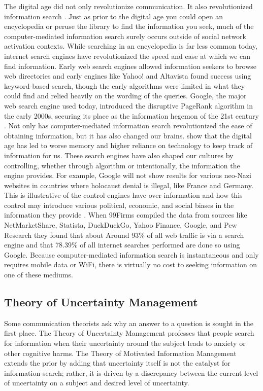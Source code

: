 The digital age did not only revolutionize communication. It also
revolutionized information search \citep{ramirez2002information}. Just as prior
to the digital age you could open an encyclopedia or peruse the library to find
the information you seek, much of the computer-mediated information search
surely occurs outside of social network activation contexts. While searching in
an encyclopedia is far less common today, internet search engines have
revolutionized the speed and ease at which we can find information. Early web
search engines allowed information seekers to browse web directories and early
engines like Yahoo! and Altavista found success using keyword-based search,
though the early algorithms were limited in what they could find and relied
heavily on the wording of the queries. Google, the major web search engine used
today, introduced the disruptive PageRank algorithm in the early 2000s, securing
its place as the information hegemon of the 21st century
\citep{brin1998anatomy}. Not only has computer-mediated information search
revolutionized the ease of obtaining information, but it has also changed our
brains. \citet{sparrow2011google} show that the digital age has led to worse
memory and higher reliance on technology to keep track of information for us.
These search engines have also shaped our cultures by controlling, whether
through algorithm or intentionally, the information the engine provides. For
example, Google will not show results for various neo-Nazi websites in countries
where holocaust denial is illegal, like France and Germany. This is illustrative
of the control engines have over information and how this control may introduce
various political, economic, and social biases in the information they provide
\citep{segev2010google}. When 99Firms \citeyearpar{99firms22} compiled the data
from sources like NetMarketShare, Statista, DuckDuckGo, Yahoo Finance, Google,
and Pew Research they found that about Around 93\% of all web traffic is
via a search engine and that 78.39\% of all internet searches performed are done
so using Google. Because computer-mediated information search is instantaneous 
and only requires mobile data or WiFi, there is virtually no cost to seeking
information on one of these mediums.

\subsection{Theory of Uncertainty Management}

Some communication theorists ask why an answer to a question is sought in the
first place. The Theory of Uncertainty Management
\citep{brashersCommunicationUncertaintyManagement2001} professes that people
search for information when their uncertainty around the subject leads to
anxiety or other cognitive harms. The Theory of Motivated Information Management
\citep{afifiSeekingInformationSexual2006, afifiTheoryMotivatedInformation2004}
extends the prior by adding that uncertainty itself is not the catalyst for
information-search; rather, it is driven by a discrepancy between the current
level of uncertainty on a subject and desired level of uncertainty.

